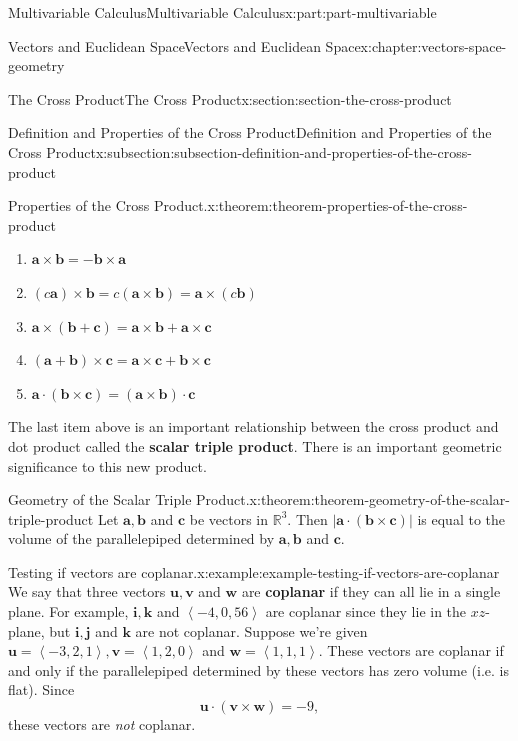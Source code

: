 \documentclass[twoside,10pt,]{tufte-book}
\newcommand{\terminology}[1]{\textbf{#1}}
\numberwithin{equation}{part}
\newcommand{\RR}{\mathbb{R}}
\newcommand{\dotprod}[1]{\left\langle #1 \right\rangle}
\begin{document}
\begin{partptx}{Multivariable Calculus}{}{Multivariable Calculus}{}{}{x:part:part-multivariable}
\begin{chapterptx}{Vectors and Euclidean Space}{}{Vectors and Euclidean Space}{}{}{x:chapter:vectors-space-geometry}
\begin{sectionptx}{The Cross Product}{}{The Cross Product}{}{}{x:section:section-the-cross-product}
\begin{subsectionptx}{Definition and Properties of the Cross Product}{}{Definition and Properties of the Cross Product}{}{}{x:subsection:subsection-definition-and-properties-of-the-cross-product}
\begin{theorem}{Properties of the Cross Product.}{}{x:theorem:theorem-properties-of-the-cross-product}
\begin{multicols}{2}
\begin{enumerate}
\item{}\(\displaystyle \mathbf{a}\times\mathbf{b} = -\mathbf{b}\times\mathbf{a}\)%
\item{}\(\displaystyle (c\mathbf{a})\times\mathbf{b} = c(\mathbf{a}\times\mathbf{b}) = \mathbf{a}\times(c\mathbf{b})\)%
\item{}\(\displaystyle \mathbf{a}\times(\mathbf{b}+\mathbf{c}) = \mathbf{a}\times\mathbf{b}+\mathbf{a}\times\mathbf{c}\)%
\item{}\(\displaystyle (\mathbf{a}+\mathbf{b})\times\mathbf{c} = \mathbf{a}\times\mathbf{c}+\mathbf{b}\times\mathbf{c}\)%
\item{}\(\displaystyle \mathbf{a}\cdot(\mathbf{b}\times\mathbf{c}) = (\mathbf{a}\times\mathbf{b})\cdot\mathbf{c}\)%
\end{enumerate}
\end{multicols}
\end{theorem}
The last item above is an important relationship between the cross product and dot product called the \terminology{scalar triple product}. There is an important geometric significance to this new product.%
\begin{theorem}{Geometry of the Scalar Triple Product.}{}{x:theorem:theorem-geometry-of-the-scalar-triple-product}%
%
Let \(\mathbf{a},\mathbf{b}\) and \(\mathbf{c}\) be vectors in \(\RR^{3}\). Then \(|\mathbf{a}\cdot(\mathbf{b}\times\mathbf{c})|\) is equal to the volume of the parallelepiped determined by \(\mathbf{a},\mathbf{b}\) and \(\mathbf{c}\).%
\end{theorem}
\begin{example}{Testing if vectors are coplanar.}{x:example:example-testing-if-vectors-are-coplanar}%
We say that three vectors \(\mathbf{u},\mathbf{v}\) and \(\mathbf{w}\) are \terminology{coplanar} if they can all lie in a single plane. For example, \(\mathbf{i},\mathbf{k}\) and \(\dotprod{-4,0,56}\) are coplanar since they lie in the \(xz\)-plane, but \(\mathbf{i},\mathbf{j}\) and \(\mathbf{k}\) are not coplanar. Suppose we're given \(\mathbf{u} = \dotprod{-3,2,1},\mathbf{v} = \dotprod{1,2,0}\) and \(\mathbf{w} = \dotprod{1,1,1}\). These vectors are coplanar if and only if the parallelepiped determined by these vectors has zero volume (i.e. is flat). Since%
%
\begin{equation*}
\mathbf{u}\cdot(\mathbf{v}\times\mathbf{w}) = -9,
\end{equation*}
these vectors are \emph{not} coplanar.%
\end{example}

\end{subsectionptx}
\end{sectionptx}
\end{chapterptx}
\end{partptx}
\end{document}
